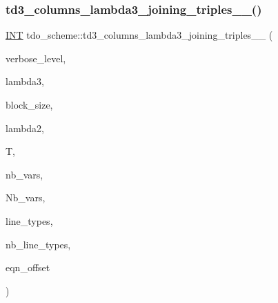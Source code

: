 \subsubsection{\texorpdfstring{td3\+\_\+columns\+\_\+lambda3\+\_\+joining\+\_\+triples\+\_\+\_()}{td3\_columns\_lambda3\_joining\_triples\_2\_1()}}
{\footnotesize\ttfamily \mbox{\hyperlink{galois_8h_a09fddde158a3a20bd2dcadb609de11dc}{I\+NT}} tdo\+\_\+scheme\+::td3\+\_\+columns\+\_\+lambda3\+\_\+joining\+\_\+triples\+\_\+\_ (\begin{DoxyParamCaption}\item[{\mbox{\hyperlink{galois_8h_a09fddde158a3a20bd2dcadb609de11dc}{I\+NT}}}]{verbose\+\_\+level,  }\item[{\mbox{\hyperlink{galois_8h_a09fddde158a3a20bd2dcadb609de11dc}{I\+NT}}}]{lambda3,  }\item[{\mbox{\hyperlink{galois_8h_a09fddde158a3a20bd2dcadb609de11dc}{I\+NT}}}]{block\+\_\+size,  }\item[{\mbox{\hyperlink{galois_8h_a09fddde158a3a20bd2dcadb609de11dc}{I\+NT}}}]{lambda2,  }\item[{\mbox{\hyperlink{classtdo__data}{tdo\+\_\+data}} \&}]{T,  }\item[{\mbox{\hyperlink{galois_8h_a09fddde158a3a20bd2dcadb609de11dc}{I\+NT}}}]{nb\+\_\+vars,  }\item[{\mbox{\hyperlink{galois_8h_a09fddde158a3a20bd2dcadb609de11dc}{I\+NT}}}]{Nb\+\_\+vars,  }\item[{\mbox{\hyperlink{galois_8h_a09fddde158a3a20bd2dcadb609de11dc}{I\+NT}} $\ast$\&}]{line\+\_\+types,  }\item[{\mbox{\hyperlink{galois_8h_a09fddde158a3a20bd2dcadb609de11dc}{I\+NT}} \&}]{nb\+\_\+line\+\_\+types,  }\item[{\mbox{\hyperlink{galois_8h_a09fddde158a3a20bd2dcadb609de11dc}{I\+NT}}}]{eqn\+\_\+offset }\end{DoxyParamCaption})}

\mbox{\label{classtdo__scheme_a462fb2835fa74d5eedf15a494d04e4bb}} 
